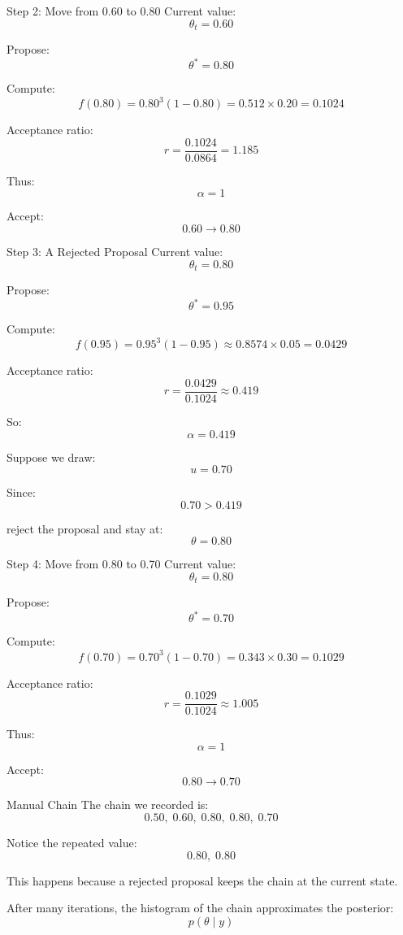 \documentclass[aspectratio=43,11pt]{beamer}
\begin{document}
\begin{frame}{Step 2: Move from 0.60 to 0.80}
Current value:
\[
\theta_t=0.60
\]

Propose:
\[
\theta^*=0.80
\]

Compute:
\[
 f(0.80)=0.80^3(1-0.80)=0.512 \times 0.20=0.1024
\]

Acceptance ratio:
\[
 r=\frac{0.1024}{0.0864}=1.185
\]

Thus:
\[
\alpha=1
\]

Accept:
\[
0.60 \rightarrow 0.80
\]
\end{frame}

\begin{frame}{Step 3: A Rejected Proposal}
\small
Current value:
\[
\theta_t=0.80
\]

Propose:
\[
\theta^*=0.95
\]

Compute:
\[
 f(0.95)=0.95^3(1-0.95)\approx 0.8574\times 0.05=0.0429
\]

Acceptance ratio:
\[
 r=\frac{0.0429}{0.1024}\approx 0.419
\]

So:
\[
\alpha=0.419
\]

Suppose we draw: %
\[
u=0.70
\]

Since:
\[
0.70>0.419
\]

reject the proposal and stay at:
\[
\theta=0.80
\]
\end{frame}

\begin{frame}{Step 4: Move from 0.80 to 0.70}
Current value:
\[
\theta_t=0.80
\]

Propose:
\[
\theta^*=0.70
\]

Compute:
\[
 f(0.70)=0.70^3(1-0.70)=0.343 \times 0.30=0.1029
\]

Acceptance ratio:
\[
 r=\frac{0.1029}{0.1024}\approx1.005
\]

Thus:
\[
\alpha=1
\]

Accept:
\[
0.80 \rightarrow 0.70
\]
\end{frame}

\begin{frame}{Manual Chain}
The chain we recorded is:
\[
0.50,\;0.60,\;0.80,\;0.80,\;0.70
\]

\vspace{0.4cm}
Notice the repeated value:
\[
0.80,\;0.80
\]

This happens because a rejected proposal keeps the chain at the current state.

\vspace{0.4cm}
After many iterations, the histogram of the chain approximates the posterior:
\[
p(\theta \mid y)
\]
\end{frame}
\end{document}
